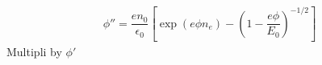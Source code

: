 \documentclass[10pt,a4paper]{article}
\begin{document}
	\begin{align}
		\phi'' = \dfrac{e n_0}{\epsilon_0} \left[\exp\left(e \phi n_e\right) - \left(1 - \dfrac{e \phi}{E_0}\right)^{-1/2}\right]
	\end{align}
	Multipli by $\phi'$
\end{document}
